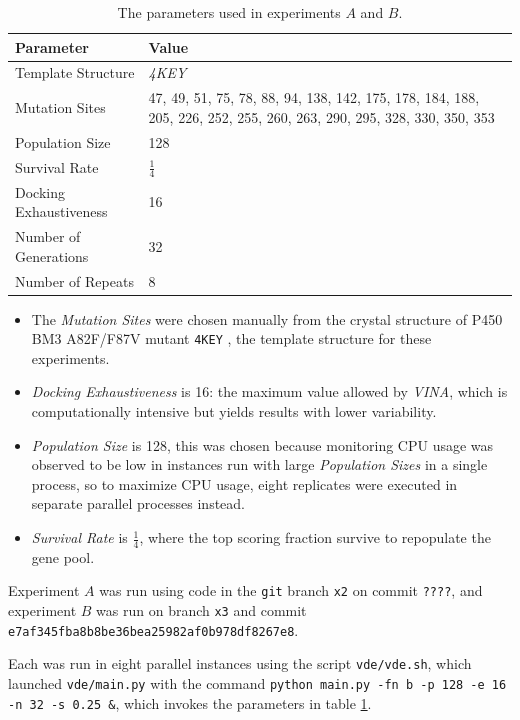 \documentclass[16pt]{book}
\begin{document}
\begin{table}
        \begin{center}
		\caption{\label{config} The parameters used in experiments $A$ and $B$.}
                \begin{tabular}{l|p{3cm}}
		\textbf{Parameter} & \textbf{Value} \\
                \hline
			Template Structure & \textit{4KEY} \cite{butler2013key}\\
		Mutation Sites & 47, 49, 51, 75, 78, 88, 94, 138, 142, 175, 178, 184, 188, 205, 226, 252, 255, 260, 263, 290, 295, 328, 330, 350, 353 \\
		Population Size & 128 \\
		Survival Rate & $\frac{1}{4}$ \\
		Docking Exhaustiveness & 16 \\
		Number of Generations & 32 \\
		Number of Repeats & 8 \\
        \end{tabular}
        \end{center}
\end{table}

\begin{itemize}
	\item The \textit{Mutation Sites} were chosen manually from the crystal structure of P450 BM3 A82F/F87V mutant \texttt{4KEY} \cite{butler2013key}, the template structure for these experiments.
	\item \textit{Docking Exhaustiveness} is 16: the maximum value allowed by \textit{VINA}, which is computationally intensive but yields results with lower variability.
	\item \textit{Population Size} is 128, this was chosen because monitoring CPU usage was observed to be low in instances run with large \textit{Population Sizes} in a single process, so to maximize CPU usage, eight replicates were executed in separate parallel processes instead.

	\item \textit{Survival Rate} is $\frac{1}{4}$, where the top scoring fraction survive to repopulate the gene pool.
\end{itemize}

Experiment $A$ was run using code in the \texttt{git} branch \texttt{x2} on commit \texttt{????}, and experiment $B$ was run on branch \texttt{x3} and commit \texttt{e7af345fba8b8be36bea25982af0b978df8267e8}.

Each was run in eight parallel instances using the script \texttt{vde/vde.sh}, which launched \texttt{vde/main.py} with the command \texttt{python main.py -fn b -p 128 -e 16 -n 32 -s 0.25 \&}, which invokes the parameters in table \ref{config}.
\end{document}
